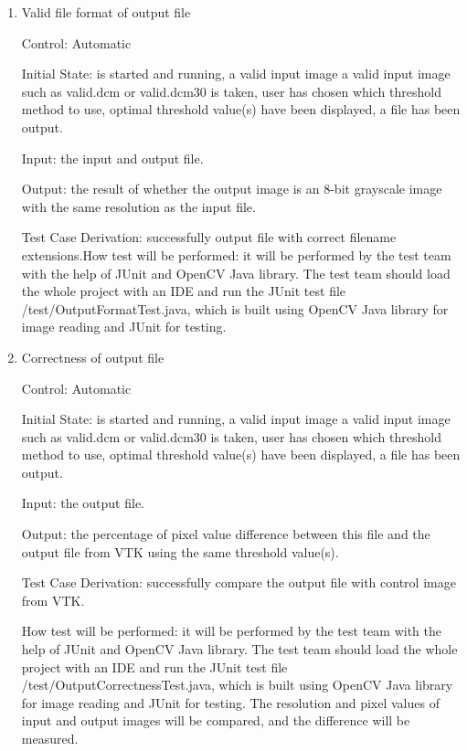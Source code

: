 \documentclass[12pt, titlepage]{article}
\begin{document}
\begin{enumerate}

\item{Valid file format of output file}

Control: Automatic
					
Initial State: \progname{} is started and running, a valid input image a valid
input image such as valid.dcm or valid.dcm30 is taken, user has chosen which
threshold method to use, optimal threshold value(s) have been displayed, a file
has been output.
					
Input: the input and output file.
					
Output: the result of whether the output image is an 8-bit grayscale image with
the same resolution as the input file.

Test Case Derivation: successfully output file with correct filename
extensions.How test will be performed: it will be performed by the test team
with the help
of JUnit and OpenCV Java library. The test team should load the whole project
with an IDE and run the JUnit test file /test/OutputFormatTest.java, which is
built using OpenCV Java library for image reading and JUnit for testing.

\item{Correctness of output file}


Control: Automatic
					
Initial State: \progname{} is started and running, a valid input image a valid
input image such as valid.dcm or valid.dcm30 is taken, user has chosen which
threshold method to use, optimal threshold value(s) have been displayed, a file
has been output.
					
Input: the output file.
					
Output: the percentage of pixel value difference between this file and the
output file from VTK using the same threshold value(s).

Test Case Derivation: successfully compare the output file with control image
from VTK.

How test will be performed: it will be performed by the test team with the help
of JUnit and OpenCV Java library. The test team should load the whole project
with an IDE and run the JUnit test file /test/OutputCorrectnessTest.java, which
is built using OpenCV Java library for image reading and JUnit for testing. The
resolution and pixel values of input and output images will be compared, and
the difference will be measured.

\end{enumerate}
\end{document}
